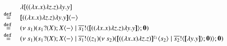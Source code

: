 


\[
\begin{array}{rcl}
	& & \lambda[((\labs{x}{x}) \labs{z}{z}) \labs{y}{y}]\\
	&\defeq& \appl{\map{((\labs{x}{x}) \labs{z}{z}) \labs{y}{y}}}{-}\\
	&\defeq& \newsp{s_1}{ \binp{s_1}{X} \appl{X}{-} \Par \bout{\dual{s_1}}{\map{((\labs{x}{x}) \labs{z}{z}) \labs{y}{y}}} \inact}\\
	&\defeq& \newsp{s_1}{ \binp{s_1}{X} \appl{X}{-} \Par \bout{\dual{s_1}}{\abs{z_1}{\newsp{s_2}{ \appl{\map{((\labs{x}{x}) \labs{z}{z})}^{z_1}}{s_2} \Par \bout{\dual{s_2}}{\map{\labs{y}{y}}} \inact }}} \inact}\\
\end{array}
\]
